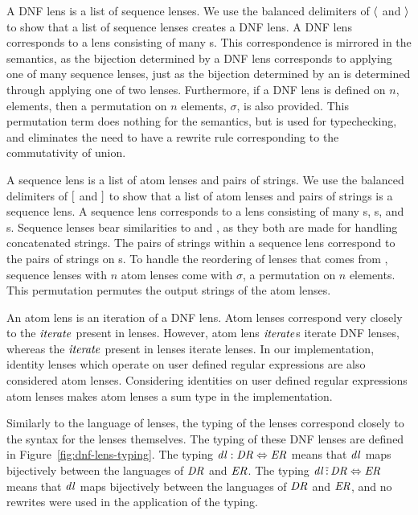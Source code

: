 \documentclass[numbers,10pt,preprint\ifanon ,nocopyrightspace\fi]{sigplanconf}
\begin{document}
A DNF lens is a list of sequence lenses.
We use the balanced delimiters of
$\langle$ and $\rangle$ to show that a list of sequence lenses
creates a DNF lens.
A DNF lens corresponds
to a lens consisting of many \OrLens{}s.  This correspondence is mirrored in the semantics, as the
bijection determined by a DNF lens corresponds to applying one of many sequence
lenses, just as the bijection determined by an \OrLens{} is determined through
applying one of two lenses.  Furthermore, if a DNF lens is defined on $n$,
elements, then a permutation on $n$ elements, $\sigma$, is also provided.  This
permutation term
does nothing for the semantics, but is used for typechecking, and eliminates the
need to have a rewrite rule corresponding to the commutativity of union.

A sequence lens is a list of atom lenses and pairs of strings.
We use the balanced delimiters of $[$ and 
$]$ to show that a list of atom lenses and pairs of strings is
a sequence lens.
A sequence lens corresponds to a lens consisting of many \ConcatLens{}s,
\SwapLens{}s, and \ConstLens{}s.
Sequence lenses bear similarities to \ConcatLens{} and
\SwapLens{}, as they both are made for handling concatenated strings.  The
pairs of strings within a sequence lens correspond to the pairs of strings on
\ConstLens{}s.
To handle the reordering of lenses that comes from
\SwapLens{}, sequence lenses with $n$ atom lenses come with $\sigma$, a
permutation on $n$ elements.  This permutation permutes the output strings of
the atom lenses.

An atom lens is an iteration of a DNF lens.  Atom lenses correspond very closely to
the $\mathit{iterate}$ present in lenses.  However, atom lens $\mathit{iterate}$s
iterate DNF lenses,
whereas the $\mathit{iterate}$ present in lenses iterate lenses.  In our
implementation, identity lenses which operate on user defined regular
expressions are also considered atom lenses.  Considering identities on
user defined regular expressions atom lenses makes atom lenses a sum type
in the implementation.

Similarly to the language of lenses, the typing of the lenses
correspond closely to the syntax for the lenses themselves.
The typing of these DNF lenses are defined in Figure~\ref{fig:dnf-lens-typing}.
The typing $\mathit{dl} : \mathit{DR} \Leftrightarrow \mathit{ER}$ means that
$\mathit{dl}$ maps bijectively between the languages of $\mathit{DR}$ and
$\mathit{ER}$.  The typing $\mathit{dl} \,\tilde{:}\, \mathit{DR}
\Leftrightarrow \mathit{ER}$ means that $\mathit{dl}$ maps bijectively between the
languages of $\mathit{DR}$ and $\mathit{ER}$, and no rewrites were used in the
application of the typing.
\end{document}
